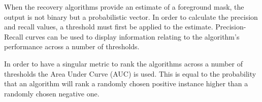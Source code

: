 When the recovery algorithms provide an estimate of a foreground mask, the output is not binary but a probabilistic vector. In order to calculate the precision and recall values, a threshold must first be applied to the estimate. Precision-Recall curves can be used to display information relating to the algorithm's performance across a number of thresholds.

In order to have a singular metric to rank the algorithms across a number of thresholds the Area Under Curve (AUC) \citep{Hanley1983} is used. This is equal to the probability that an algorithm  will rank a randomly chosen positive instance higher than a randomly chosen negative one. 

